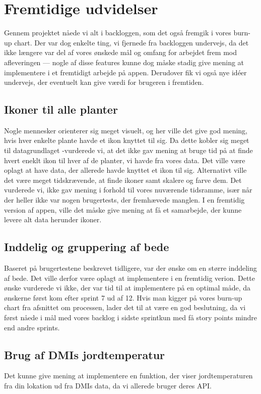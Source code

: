 \section{Fremtidige udvidelser}
Gennem projektet nåede vi alt i backloggen, som det også fremgik i vores burn-up chart. Der var dog enkelte ting, vi fjernede fra backloggen undervejs, da det ikke længere var del af vores ønskede mål og omfang for arbejdet frem mod afleveringen --- nogle af disse features kunne dog måske stadig give mening at implementere i et fremtidigt arbejde på appen. Derudover fik vi også nye idéer undervejs, der eventuelt kan give værdi for brugeren i fremtiden.

\subsection{Ikoner til alle planter}
Nogle mennesker orienterer sig meget visuelt, og her ville det give god mening, hvis hver enkelte plante havde et ikon knyttet til sig. Da dette kobler sig meget til datagrundlaget -vurderede vi, at det ikke gav mening at bruge tid på at finde hvert eneklt ikon til hver af de planter, vi havde fra vores data. Det ville være oplagt at have data, der allerede havde knyttet et ikon til sig. Alternativt ville det være meget tidskrævende, at finde ikoner samt skalere og farve dem. Det vurderede vi, ikke gav mening i forhold til vores nuværende tidsramme, især når der heller ikke var nogen brugertests, der fremhævede manglen. I en fremtidig version af appen, ville det måske give mening at få et samarbejde, der kunne levere alt data herunder ikoner. 

\subsection{Inddelig og gruppering af bede}
Baseret på brugertestene beskrevet tidligere, var der ønske om en større inddeling af bede. Det ville derfor være oplagt at implementere i en fremtidig verion. Dette ønske vurderede vi ikke, der var tid til at implementere på en optimal måde, da ønskerne først kom efter sprint 7 ud af 12. Hvis man kigger på vores burn-up chart fra afsnittet om processen, lader det til at være en god beslutning, da vi først nåede i mål med vores backlog i sidste sprintkun med få story points mindre end andre sprints.

\subsection{Brug af DMIs jordtemperatur}
Det kunne give mening at implementere en funktion, der viser jordtemperaturen fra din lokation ud fra DMIs data, da vi allerede bruger deres API.

